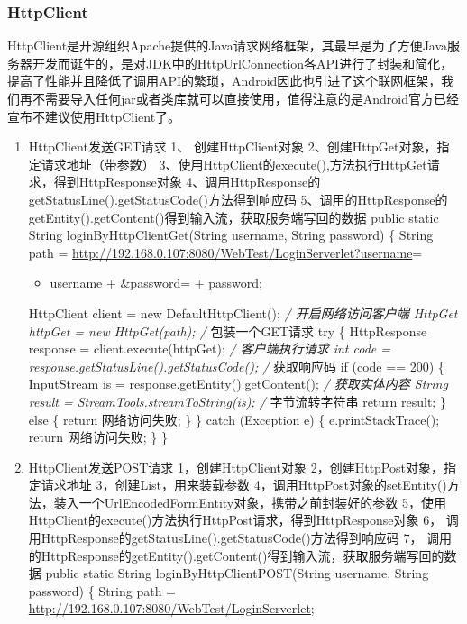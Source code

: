 \documentclass[9pt, b5paper]{article}
\begin{document}
\subsubsection{HttpClient}
\label{sec-7-0-7}
HttpClient是开源组织Apache提供的Java请求网络框架，其最早是为了方便Java服务器开发而诞生的，是对JDK中的HttpUrlConnection各API进行了封装和简化，提高了性能并且降低了调用API的繁琐，Android因此也引进了这个联网框架，我们再不需要导入任何jar或者类库就可以直接使用，值得注意的是Android官方已经宣布不建议使用HttpClient了。
\begin{enumerate}
\item HttpClient发送GET请求
\label{sec-7-0-7-1}
1、 创建HttpClient对象
2、创建HttpGet对象，指定请求地址（带参数）
3、使用HttpClient的execute(),方法执行HttpGet请求，得到HttpResponse对象
4、调用HttpResponse的getStatusLine().getStatusCode()方法得到响应码
5、调用的HttpResponse的getEntity().getContent()得到输入流，获取服务端写回的数据
public static String loginByHttpClientGet(String username, String password) \{
        String path = \url{http://192.168.0.107:8080/WebTest/LoginServerlet?username}=
\begin{itemize}
\item username + \&password= + password;
\end{itemize}
    HttpClient client = new DefaultHttpClient(); \emph{/ 开启网络访问客户端
    HttpGet httpGet = new HttpGet(path); /} 包装一个GET请求
    try \{
        HttpResponse response = client.execute(httpGet); \emph{/ 客户端执行请求
        int code = response.getStatusLine().getStatusCode(); /} 获取响应码
        if (code == 200) \{
            InputStream is = response.getEntity().getContent(); \emph{/ 获取实体内容
            String result = StreamTools.streamToString(is); /} 字节流转字符串
            return result;
        \} else \{
            return 网络访问失败;
        \}
    \} catch (Exception e) \{
        e.printStackTrace();
        return 网络访问失败;
    \}
\}
\item HttpClient发送POST请求
\label{sec-7-0-7-2}
1，创建HttpClient对象
2，创建HttpPost对象，指定请求地址
3，创建List，用来装载参数
4，调用HttpPost对象的setEntity()方法，装入一个UrlEncodedFormEntity对象，携带之前封装好的参数
5，使用HttpClient的execute()方法执行HttpPost请求，得到HttpResponse对象
6， 调用HttpResponse的getStatusLine().getStatusCode()方法得到响应码
7， 调用的HttpResponse的getEntity().getContent()得到输入流，获取服务端写回的数据
public static String loginByHttpClientPOST(String username, String password) \{
        String path = \url{http://192.168.0.107:8080/WebTest/LoginServerlet};

\end{enumerate}
\end{document}
